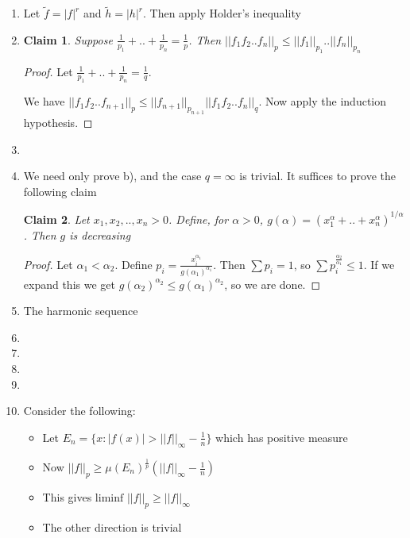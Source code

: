 \documentclass{article}
\newtheorem*{claim}{Claim}
\begin{document}
\begin{enumerate}
    The given condition is $\mu\{x:f(x)\neq 0,|h(x)| \neq ||h||_\infty\}=0$. This is equivalent by Problem 4.

    \item Let $\tilde{f}=|f|^r$ and $\tilde{h}=|h|^r$. Then apply Holder's inequality

    \item \begin{claim}
        Suppose $\frac{1}{p_1}+..+\frac{1}{p_n}=\frac{1}{p}$. Then $||f_1f_2..f_n||_p\leq||f_1||_{p_1}..||f_n||_{p_n}$
    \end{claim}

    \begin{proof}
        Let $\frac{1}{p_1}+..+\frac{1}{p_n}=\frac{1}{q}$.
        
        We have $||f_1 f_2..f_{n+1}||_p\leq ||f_{n+1}||_{p_{n+1}}||f_1f_2..f_n||_q$. Now apply the induction hypothesis.
    \end{proof}
    
    \item 

    \item We need only prove b), and the case $q=\infty$ is trivial. It suffices to prove the following claim

    \begin{claim}
        Let $x_1,x_2,..,x_n>0$. Define, for $\alpha > 0$, $g(\alpha)=(x_1^\alpha+..+x_n^\alpha)^{1/\alpha}$. Then $g$ is decreasing
    \end{claim}

    \begin{proof}
        Let $\alpha_1 < \alpha_2$. Define $p_i=\frac{x_i^{\alpha_1}}{g(\alpha_1)^{\alpha_1}}$. 
        Then $\sum p_i=1$, so $\sum p_i^\frac{\alpha_2}{\alpha_1}\leq 1$. 
        If we expand this we get $g(\alpha_2)^{\alpha_2}\leq g(\alpha_1)^{\alpha_2}$, so we are done.
    \end{proof}

    \item The harmonic sequence
    
    \item 
    \item
    \item
    \item 
    
    \item Consider the following:
          \begin{itemize}
            \item Let $E_n = \{x: |f(x)| > ||f||_\infty - \frac{1}{n}\}$ which has positive measure
            \item Now $||f||_p \geq \mu(E_n)^\frac{1}{p}(||f||_\infty - \frac{1}{n})$
            \item This gives $\text{liminf } ||f||_p \geq ||f||_\infty$
            \item The other direction is trivial
          \end{itemize}

\end{enumerate}
\end{document}
